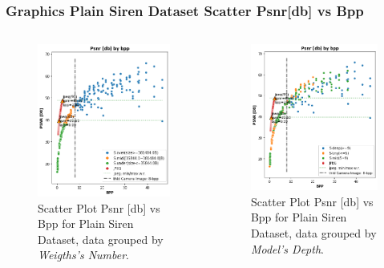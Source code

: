 



\begin{frame}
\frametitle{Graphics Plain Siren Dataset Scatter Psnr[db] vs Bpp}

\begin{columns}
\begin{figure}
\includegraphics[scale=0.35]{slides/experiments/plain_siren_dataset/baseline_bpp_vs_psnr_scatter_gby_param_class.png}
\caption{Scatter Plot Psnr [db] vs Bpp for Plain Siren Dataset, data grouped by \textit{Weigths's Number}.}
\end{figure}
\begin{figure}
\includegraphics[scale=0.35]{slides/experiments/plain_siren_dataset/baseline_bpp_vs_psnr_scatter_gby_deepness.png}
\caption{Scatter Plot Psnr [db] vs Bpp for Plain Siren Dataset, data grouped by \textit{Model's Depth}.}
\end{figure}
\end{columns}

\end{frame}

